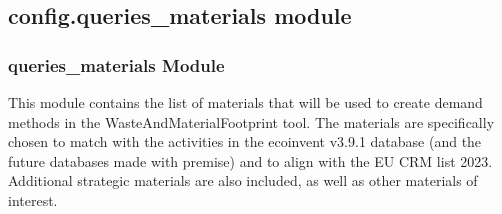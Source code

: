 \documentclass[letterpaper,10pt,english]{sphinxmanual}
\begin{document}
\begin{sphinxVerbatim}[commandchars=\\\{\}]

  \PYG{p}{[}\PYG{p}{]}
   
      
     

    
\end{sphinxVerbatim}


\subsection{config.queries\_materials module}
\label{\detokenize{configuration_api:module-config.queries_materials}}\label{\detokenize{configuration_api:config-queries-materials-module}}

\subsubsection{queries\_materials Module}
\label{\detokenize{configuration_api:queries-materials-module}}
\sphinxAtStartPar
This module contains the list of materials that will be used to create demand methods in the WasteAndMaterialFootprint tool. The materials are specifically chosen to match with the activities in the ecoinvent v3.9.1 database (and the future databases made with premise) and to align with the EU CRM list 2023. Additional strategic materials are also included, as well as other materials of interest.
\end{document}

